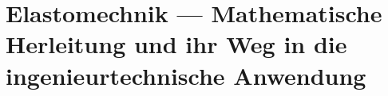 %
%
%
%
\chapter{Elastomechnik --- Mathematische Herleitung und ihr Weg in die ingenieurtechnische Anwendung\label{chapter:elastomechanik}}
\begin{refsection}
%
%
%
%








\printbibliography[heading=subbibliography]
\end{refsection}
